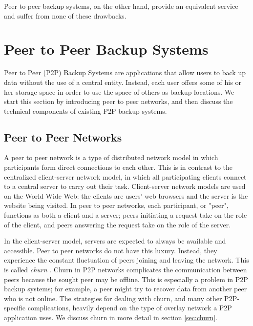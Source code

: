 \documentclass[12pt]{report}
\begin{document}
Peer to peer backup systems, on the other hand, provide an equivalent service and suffer from none of these drawbacks. 

\section{Peer to Peer Backup Systems}

Peer to Peer (P2P) Backup Systems are applications that allow users to back up data without the use of a central entity. Instead, each user offers some of his or her storage space in order to use the space of others as backup locations. We start this section by introducing peer to peer networks, and then discuss the technical components of existing P2P backup systems.

\subsection{Peer to Peer Networks}

A peer to peer network is a type of distributed network model in which participants form direct connections to each other. This is in contrast to the centralized client-server network model, in which all participating clients connect to a central server to carry out their task. Client-server network models are used on the World Wide Web: the clients are users' web browsers and the server is the website being visited. In peer to peer networks, each participant, or "peer", functions as both a client and a server; peers initiating a request take on the role of the client, and peers answering the request take on the role of the server.

In the client-server model, servers are expected to always be available and accessible. Peer to peer networks do not have this luxury. Instead, they experience the constant fluctuation of peers joining and leaving the network. This is called \textit{churn} \cite{StorageSearchP2PNetworks}. Churn in P2P networks complicates the communication between peers because the sought peer may be offline. This is especially a problem in P2P backup systems; for example, a peer might try to recover data from another peer who is not online. The strategies for dealing with churn, and many other P2P-specific complications, heavily depend on the type of overlay network a P2P application uses. We discuss churn in more detail in section \ref{sec:churn}.

\end{document}
